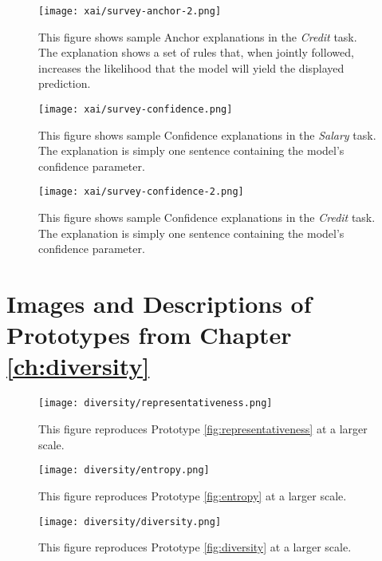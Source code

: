\begin{figure}[!hbtp]
    \centering
    \texttt{[image: xai/survey-anchor-2.png]}
    \caption{This figure shows sample Anchor explanations in the \emph{Credit} task. The explanation shows a set of rules that, when jointly followed, increases the likelihood that the model will yield the displayed prediction.}
    \label{fig:anchorcreditfull}
\end{figure}

\begin{figure}[!hbtp]
    \centering
    \texttt{[image: xai/survey-confidence.png]}
    \caption{This figure shows sample Confidence explanations in the \emph{Salary} task. The explanation is simply one sentence containing the model's confidence parameter.}
    \label{fig:confidencesalaryfull}
\end{figure}

\begin{figure}[!hbtp]
    \centering
    \texttt{[image: xai/survey-confidence-2.png]}
    \caption{This figure shows sample Confidence explanations in the \emph{Credit} task. The explanation is simply one sentence containing the model's confidence parameter.}
    \label{fig:confidencecreditfull}
\end{figure}

\newpage
\section{Images and Descriptions of Prototypes from Chapter \ref{ch:diversity}}\label{app:divfigures}

\begin{figure}[!hbtp]
    \centering
    \texttt{[image: diversity/representativeness.png]}
    \caption{This figure reproduces Prototype \ref{fig:representativeness} at a larger scale.}
    \label{fig:representativeness_full}
\end{figure}

\begin{figure}[!hbtp]
    \centering
    \texttt{[image: diversity/entropy.png]}
    \caption{This figure reproduces Prototype \ref{fig:entropy} at a larger scale.}
    \label{fig:entropy_full}
\end{figure}

\begin{figure}[!hbtp]
    \centering
    \texttt{[image: diversity/diversity.png]}
    \caption{This figure reproduces Prototype \ref{fig:diversity} at a larger scale.}
    \label{fig:diversity_full}
\end{figure}

